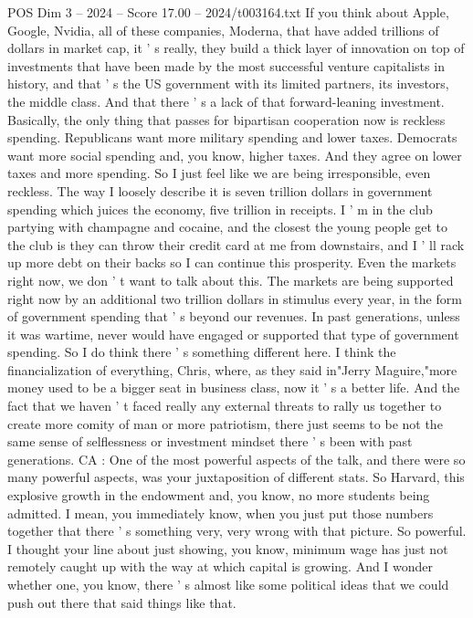 \begin{textsample}{POS Dim 3 – 2024 – Score 17.00 – 2024/t003164.txt}
If you think about Apple, Google, Nvidia, all of these companies, Moderna, that have added trillions of dollars in market cap, it ' s really, they build a thick layer of innovation on top of investments that have been made by the most successful venture capitalists in history, and that ' s the US government with its limited partners, its investors, the middle class.
And that there ' s a lack of that forward-leaning investment.
Basically, the only thing that passes for bipartisan cooperation now is reckless spending.
Republicans want more military spending and lower taxes.
Democrats want more social spending and, you know, higher taxes.
And they agree on lower taxes and more spending.
So I just feel like we are being irresponsible, even reckless.
The way I loosely describe it is seven trillion dollars in government spending which juices the economy, five trillion in receipts.
I ' m in the club partying with champagne and cocaine, and the closest the young people get to the club is they can throw their credit card at me from downstairs, and I ' ll rack up more debt on their backs so I can continue this prosperity.
Even the markets right now, we don ' t want to talk about this.
The markets are being supported right now by an additional two trillion dollars in stimulus every year, in the form of government spending that ' s beyond our revenues.
In past generations, unless it was wartime, never would have engaged or supported that type of government spending.
So I do think there ' s something different here.
I think the financialization of everything, Chris, where, as they said in"Jerry Maguire,"more money used to be a bigger seat in business class, now it ' s a better life.
And the fact that we haven ' t faced really any external threats to rally us together to create more comity of man or more patriotism, there just seems to be not the same sense of selflessness or investment mindset there ' s been with past generations.
CA : One of the most powerful aspects of the talk, and there were so many powerful aspects, was your juxtaposition of different stats.
So Harvard, this explosive growth in the endowment and, you know, no more students being admitted.
I mean, you immediately know, when you just put those numbers together that there ' s something very, very wrong with that picture.
So powerful.
I thought your line about just showing, you know, minimum wage has just not remotely caught up with the way at which capital is growing.
And I wonder whether one, you know, there ' s almost like some political ideas that we could push out there that said things like that.

\end{textsample}
